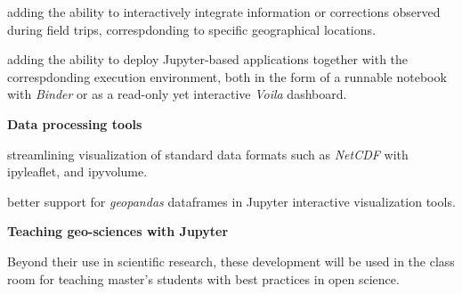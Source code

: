 \begin{task}[
  title=Geosciences application,
  id=geoscience,
  lead=UIO,
  PM=25,
  wphases={0-48},
  partners={QS,SRL,UPSUD,EGI}
]
\begin{compactitem}
  \item adding the ability to interactively integrate information or corrections
    observed during field trips, correspdonding to specific geographical locations.


  \item adding the ability to deploy Jupyter-based applications together with
    the correspdonding execution environment, both in the form of a runnable
    notebook with \emph{Binder} or as a read-only yet interactive \emph{Voila}
    dashboard.
\end{compactitem}

\textbf{Data processing tools}

\begin{compactitem}
  \item streamlining visualization of standard data formats such as \emph{NetCDF}
  with ipyleaflet, and ipyvolume.

  \item better support for \emph{geopandas} dataframes in Jupyter interactive
  visualization tools.
\end{compactitem}

\textbf{Teaching geo-sciences with Jupyter}

Beyond their use in scientific research, these development will be used in
the class room for teaching master's students with best practices in open
science.


\end{task}
